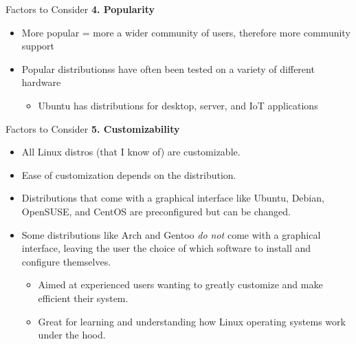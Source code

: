 \documentclass[11pt]{beamer}
\begin{document}
\begin{frame}[t]{Factors to Consider}
	\textbf{\LARGE 4. Popularity}
	\begin{itemize}
		\item More popular = more a wider community of users, therefore more community support
		\item Popular distributionss have often been tested on a variety of different hardware
		\begin{itemize}
			\item Ubuntu has distributions for desktop, server, and IoT applications
		\end{itemize}
	\end{itemize}
\end{frame}

\begin{frame}[t]{Factors to Consider}
	\textbf{\LARGE 5. Customizability}
	\begin{itemize}
		\item All Linux distros (that I know of) are customizable.
		\item Ease of customization depends on the distribution.
		\item Distributions that come with a graphical interface like Ubuntu, Debian, OpenSUSE, and CentOS are preconfigured but can be changed.
		\item Some distributions like Arch and Gentoo \textit{do not} come with a graphical interface, leaving the user the choice of which software to install and configure themselves.
		\begin{itemize}
			\item Aimed at experienced users wanting to greatly customize and make efficient their system.
			\item Great for learning and understanding how Linux operating systems work under the hood.
		\end{itemize}
	\end{itemize}
\end{frame}
\end{document}
